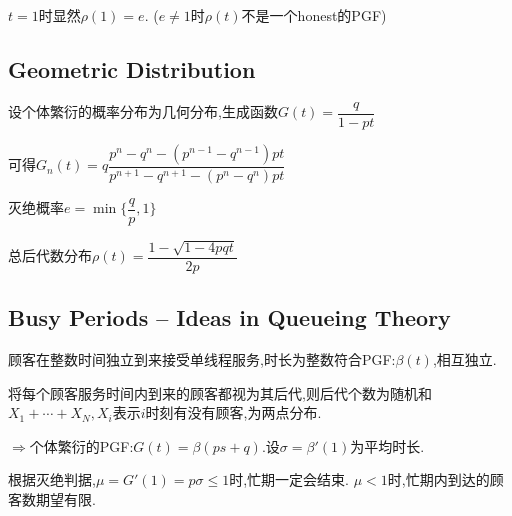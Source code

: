 $ t = 1时显然\rho(1) = e.$ ($ e \ne 1$时$ \rho(t)$不是一个honest的PGF)

\subsection{Geometric Distribution}
设个体繁衍的概率分布为几何分布,生成函数$ G(t) = \dfrac{q}{1-pt}$

可得$ G_n(t) = q\dfrac{p^n-q^n - (p^{n-1}-q^{n-1})pt}{p^{n+1}-q^{n+1}-(p^n-q^n)pt}$

灭绝概率$ e = \min\{\dfrac{q}{p},1\}$

总后代数分布$ \rho(t) = \dfrac{1-\sqrt{1-4pqt}}{2p}$

\subsection{Busy Periods -- Ideas in Queueing Theory}
顾客在整数时间独立到来接受单线程服务,时长为整数符合PGF:$ \beta(t)$,相互独立.

将每个顾客服务时间内到来的顾客都视为其后代,则后代个数为随机和$ X_1 + \cdots +X_N, X_i $表示$ i$时刻有没有顾客,为两点分布.

$ \Rightarrow $个体繁衍的PGF:$ G(t)= \beta(ps + q). $设$ \sigma = \beta'(1)$为平均时长.

根据灭绝判据,$ \mu = G'(1) = p\sigma \le 1$时,忙期一定会结束. $ \mu < 1$时,忙期内到达的顾客数期望有限.
